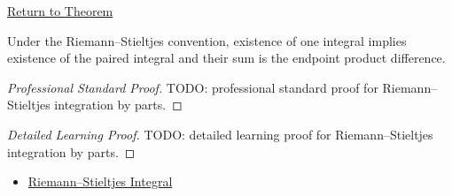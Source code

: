 \newpage
{}
\label{prf:rs-integration-by-parts}

\begin{remark*}[Return]
\hyperref[thm:rs-integration-by-parts]{Return to Theorem}
\end{remark*}

\begin{theorem*}
Under the Riemann--Stieltjes convention, existence of one integral implies
existence of the paired integral and their sum is the endpoint product
difference.
\end{theorem*}

\begin{proof}[Professional Standard Proof]
\LRAProofBodyStart
TODO: professional standard proof for Riemann--Stieltjes integration by parts.
\end{proof}

\begin{proof}[Detailed Learning Proof]
\LRAProofBodyStart
TODO: detailed learning proof for Riemann--Stieltjes integration by parts.
\end{proof}

\begin{remark*}
\end{remark*}

\begin{dependencies}
\begin{itemize}
  \item \hyperref[def:riemann-stieltjes-integral]{Riemann--Stieltjes Integral}
\end{itemize}
\end{dependencies}

\clearpage
